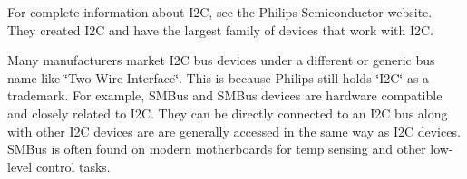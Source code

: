For complete information about I2C, see the Philips Semiconductor website. They created I2C and have the largest family of devices that work with I2C.

Many manufacturers market I2C bus devices under a different or generic bus name like \char`\"{}Two-Wire Interface\char`\"{}. This is because Philips still holds \char`\"{}I2C\char`\"{} as a trademark. For example, SMBus and SMBus devices are hardware compatible and closely related to I2C. They can be directly connected to an I2C bus along with other I2C devices are are generally accessed in the same way as I2C devices. SMBus is often found on modern motherboards for temp sensing and other low-level control tasks. 